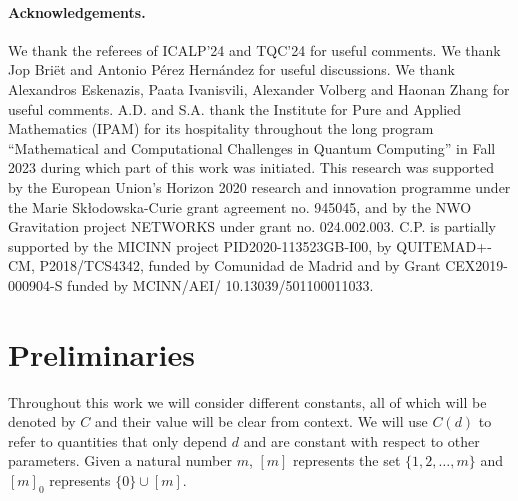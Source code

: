 \documentclass[11pt]{article}
\theoremstyle{plain}
\theoremstyle{plain}
\theoremstyle{definition}
\theoremstyle{remark}
\theoremstyle{named}
\begin{document}
\paragraph{Acknowledgements.}
We thank the referees of ICALP'24 and TQC'24 for useful comments. We thank Jop Bri\"et and Antonio Pérez Hernández for useful discussions. We thank Alexandros Eskenazis, Paata Ivanisvili, Alexander Volberg and Haonan Zhang for useful comments. A.D. and S.A. thank the Institute for Pure and Applied Mathematics (IPAM) for its hospitality throughout the long program “Mathematical and Computational Challenges in Quantum Computing” in Fall 2023 during which part of this work was initiated.
This research was supported by the European Union’s Horizon 2020 research and innovation programme under the Marie Sk{\l}odowska-Curie grant agreement no. 945045, and by the NWO Gravitation project NETWORKS under grant no. 024.002.003. C.P. is partially supported by the MICINN project PID2020-113523GB-I00, by QUITEMAD+-CM, P2018/TCS4342, funded by Comunidad de Madrid and by Grant CEX2019-000904-S funded by MCINN/AEI/ 10.13039/501100011033.








\section{Preliminaries}\label{sec:prelims}
Throughout this work we will consider different constants, all of which will be denoted by $C$ and their value will be clear from context. We will use $C(d)$ to refer to quantities that only depend $d$ and are constant with respect to other parameters. Given a natural number $m$, $[m]$ represents the set $\{1,2,\dots,m\}$ and $[m]_0$ represents $\{0\}\cup [m].$
\end{document}
